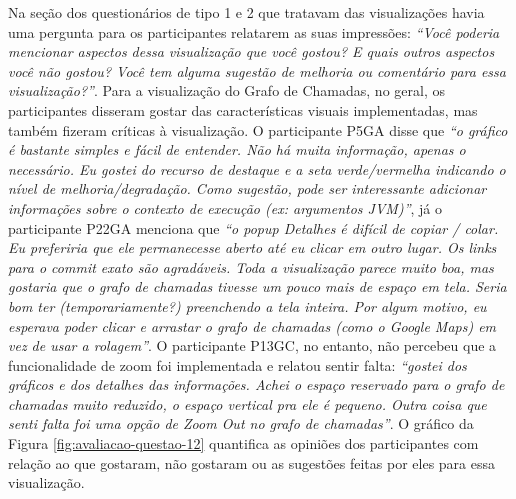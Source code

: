 Na seção dos questionários de tipo 1 e 2 que tratavam das visualizações havia uma pergunta para os participantes relatarem as suas impressões: \textit{``Você poderia mencionar aspectos dessa visualização que você gostou? E quais outros aspectos você não gostou? Você tem alguma sugestão de melhoria ou comentário para essa visualização?''}. Para a visualização do Grafo de Chamadas, no geral, os participantes disseram gostar das características visuais implementadas, mas também fizeram críticas à visualização. O participante P5GA disse que \textit{``o gráfico é bastante simples e fácil de entender. Não há muita informação, apenas o necessário. Eu gostei do recurso de destaque e a seta verde/vermelha indicando o nível de melhoria/degradação. Como sugestão, pode ser interessante adicionar informações sobre o contexto de execução (ex: argumentos JVM)''}, já o participante P22GA menciona que \textit{``o popup Detalhes é difícil de copiar / colar. Eu preferiria que ele permanecesse aberto até eu clicar em outro lugar. Os links para o commit exato são agradáveis. Toda a visualização parece muito boa, mas gostaria que o grafo de chamadas tivesse um pouco mais de espaço em tela. Seria bom ter (temporariamente?) preenchendo a tela inteira. Por algum motivo, eu esperava poder clicar e arrastar o grafo de chamadas (como o Google Maps) em vez de usar a rolagem''}. O participante P13GC, no entanto, não percebeu que a funcionalidade de zoom foi implementada e relatou sentir falta: \textit{``gostei dos gráficos e dos detalhes das informações. Achei o espaço reservado para o grafo de chamadas muito reduzido, o espaço vertical pra ele é pequeno. Outra coisa que senti falta foi uma opção de Zoom Out no grafo de chamadas''}. O gráfico da Figura \ref{fig:avaliacao-questao-12} quantifica as opiniões dos participantes com relação ao que gostaram, não gostaram ou as sugestões feitas por eles para essa visualização.

